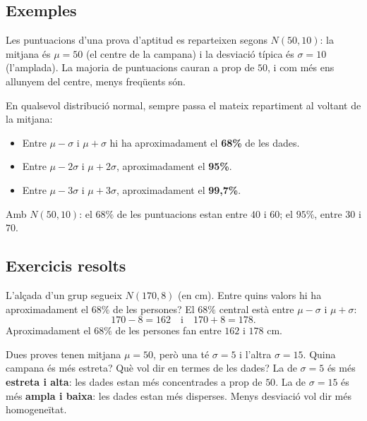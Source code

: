\subsection{Exemples}

\begin{exemple}
Les puntuacions d'una prova d'aptitud es reparteixen segons $N(50,10)$: la mitjana és
$\mu=50$ (el centre de la campana) i la desviació típica és $\sigma=10$ (l'amplada). La
majoria de puntuacions cauran a prop de $50$, i com més ens allunyem del centre, menys
freqüents són.
\end{exemple}

\begin{exemple}
En qualsevol distribució normal, sempre passa el mateix repartiment al voltant de la
mitjana:
\begin{itemize}[leftmargin=1.4em, itemsep=2pt]
  \item Entre $\mu-\sigma$ i $\mu+\sigma$ hi ha aproximadament el \textbf{68\%} de les
        dades.
  \item Entre $\mu-2\sigma$ i $\mu+2\sigma$, aproximadament el \textbf{95\%}.
  \item Entre $\mu-3\sigma$ i $\mu+3\sigma$, aproximadament el \textbf{99,7\%}.
\end{itemize}
Amb $N(50,10)$: el $68\%$ de les puntuacions estan entre $40$ i $60$; el $95\%$, entre
$30$ i $70$.
\end{exemple}

\subsection{Exercicis resolts}

\begin{exresolt}
L'alçada d'un grup segueix $N(170,8)$ (en cm). Entre quins valors hi ha aproximadament el
$68\%$ de les persones?
\solucio
El $68\%$ central està entre $\mu-\sigma$ i $\mu+\sigma$:
\[
170-8=162 \quad\text{i}\quad 170+8=178.
\]
Aproximadament el $68\%$ de les persones fan entre $162$ i $178$ cm.
\end{exresolt}

\begin{exresolt}
Dues proves tenen mitjana $\mu=50$, però una té $\sigma=5$ i l'altra $\sigma=15$. Quina
campana és més estreta? Què vol dir en termes de les dades?
\solucio
La de $\sigma=5$ és més \textbf{estreta i alta}: les dades estan més concentrades a prop
de $50$. La de $\sigma=15$ és més \textbf{ampla i baixa}: les dades estan més disperses.
Menys desviació vol dir més homogeneïtat.
\end{exresolt}

